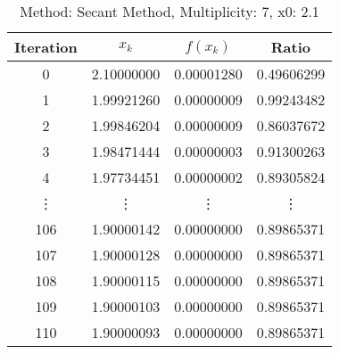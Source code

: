 \begin{table}
\centering
\caption{Method: Secant Method, Multiplicity: 7, x0: 2.1}
\label{tab:table_Secant_Method_7_2_1}
\begin{tabular}{c c c c}
\toprule
Iteration &      $x_k$ &   $f(x_k)$ &      Ratio \\
\midrule
        0 & 2.10000000 & 0.00001280 & 0.49606299 \\
        1 & 1.99921260 & 0.00000009 & 0.99243482 \\
        2 & 1.99846204 & 0.00000009 & 0.86037672 \\
        3 & 1.98471444 & 0.00000003 & 0.91300263 \\
        4 & 1.97734451 & 0.00000002 & 0.89305824 \\
   \vdots &     \vdots &     \vdots &     \vdots \\
      106 & 1.90000142 & 0.00000000 & 0.89865371 \\
      107 & 1.90000128 & 0.00000000 & 0.89865371 \\
      108 & 1.90000115 & 0.00000000 & 0.89865371 \\
      109 & 1.90000103 & 0.00000000 & 0.89865371 \\
      110 & 1.90000093 & 0.00000000 & 0.89865371 \\
\bottomrule
\end{tabular}
\end{table}

